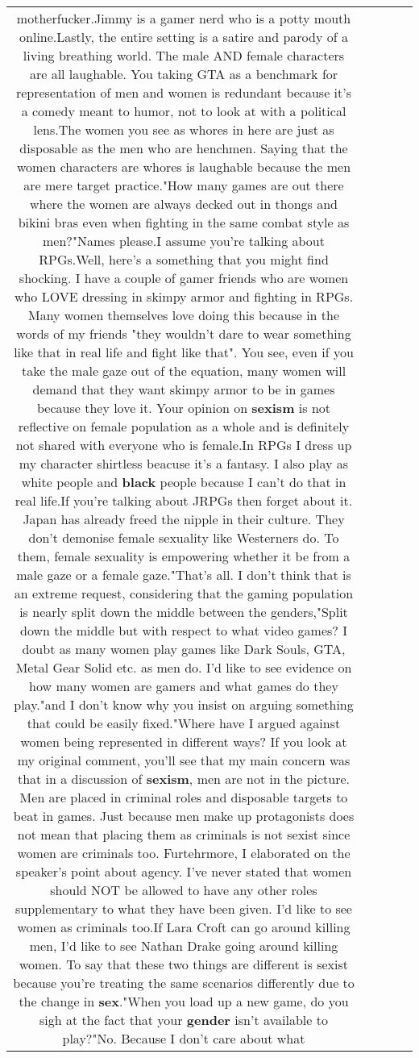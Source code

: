 \documentclass[11pt]{article}
\newlength\mylength
\begin{document}
\begin{center}
\begin{longtable}{|C{.65\mylength}|C{.30\mylength}|C{.12\mylength}|C{.12\mylength}|C{.12\mylength}|}
motherfucker.Jimmy is a gamer nerd who is a potty mouth online.Lastly, the entire setting is a satire and parody of a living breathing world. The male AND female characters are all laughable. You taking GTA as a benchmark for representation of men and women is redundant because it's a comedy meant to humor, not to look at with a political lens.The women you see as whores in here are just as disposable as the men who are henchmen. Saying that the women characters are whores is laughable because the men are mere target practice."How many games are out there where the women are always decked out in thongs and bikini bras even when fighting in the same combat style as men?"Names please.I assume you're talking about RPGs.Well, here's a something that you might find shocking. I have a couple of gamer friends who are women who LOVE dressing in skimpy armor and fighting in RPGs. Many women themselves love doing this because in the words of my friends "they wouldn't dare to wear something like that in real life and fight like that". You see, even if you take the male gaze out of the equation, many women will demand that they want skimpy armor to be in games because they love it. Your opinion on \textbf{sexism} is not reflective on female population as a whole and is definitely not shared with everyone who is female.In RPGs I dress up my character shirtless beacuse it's a fantasy. I also play as white people and \textbf{black} people because I can't do that in real life.If you're talking about JRPGs then forget about it. Japan has already freed the nipple in their culture. They don't demonise female sexuality like Westerners do. To them, female sexuality is empowering whether it be from a male gaze or a female gaze."That's all. I don't think that is an extreme request, considering that the gaming population is nearly split down the middle between the genders,"Split down the middle but with respect to what video games? I doubt as many women play games like Dark Souls, GTA, Metal Gear Solid etc. as men do. I'd like to see evidence on how many women are gamers and what games do they play."and I don't know why you insist on arguing something that could be easily fixed."Where have I argued against women being represented in different ways? If you look at my original comment, you'll see that my main concern was that in a discussion of \textbf{sexism}, men are not in the picture. Men are placed in criminal roles and disposable targets to beat in games. Just because men make up protagonists does not mean that placing them as criminals is not sexist since women are criminals too. Furtehrmore, I elaborated on the speaker's point about agency. I've never stated that women should NOT be allowed to have any other roles supplementary to what they have been given. I'd like to see women as criminals too.If Lara Croft can go around killing men, I'd like to see Nathan Drake going around killing women. To say that these two things are different is sexist because you're treating the same scenarios differently due to the change in \textbf{sex}."When you load up a new game, do you sigh at the fact that your \textbf{gender} isn't available to play?"No. Because I don't care about what 
\end{longtable}
\end{center}
\end{document}
